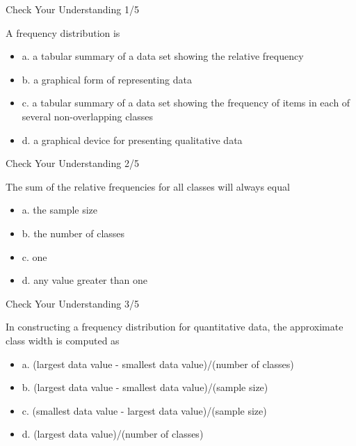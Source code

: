 \documentclass{beamer}
\begin{document}
\begin{frame}{Check Your Understanding 1/5}

A frequency distribution is
\begin{itemize}
\item a. a tabular summary of a data set showing the relative frequency
\item b. a graphical form of representing data
\item c. a tabular summary of a data set showing the frequency of items in each of several non-overlapping classes
\item d. a graphical device for presenting qualitative data

\end{itemize}
\end{frame}


\begin{frame}{Check Your Understanding 2/5}

The sum of the relative frequencies for all classes will always equal
\begin{itemize}
\item a.	the sample size
\item b.	the number of classes
\item c.	one
\item d.	any value greater than one

\end{itemize}
\end{frame}

\begin{frame}{Check Your Understanding 3/5}

In constructing a frequency distribution for quantitative data, the approximate class width is computed as
\begin{itemize}
\item a.	(largest data value - smallest data value)/(number of classes)
\item b.	(largest data value - smallest data value)/(sample size)
\item c.	(smallest data value - largest data value)/(sample size)
\item d.	(largest data value)/(number of classes)

\end{itemize}
\end{frame}
\end{document}
